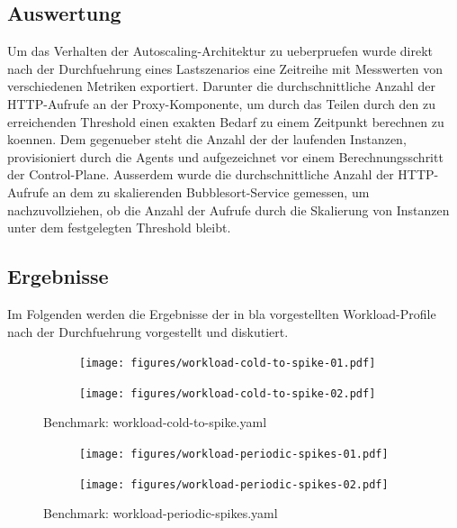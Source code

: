 \documentclass[runningheads]{llncs}
\begin{document}
\subsection{Auswertung}

Um das Verhalten der Autoscaling-Architektur zu ueberpruefen wurde direkt nach der Durchfuehrung eines Lastszenarios eine Zeitreihe mit Messwerten von verschiedenen Metriken exportiert. Darunter die durchschnittliche Anzahl der HTTP-Aufrufe an der Proxy-Komponente, um durch das Teilen durch den zu erreichenden Threshold einen exakten Bedarf zu einem Zeitpunkt berechnen zu koennen. Dem gegenueber steht die Anzahl der der laufenden Instanzen, provisioniert durch die Agents und aufgezeichnet vor einem Berechnungsschritt der Control-Plane. Ausserdem wurde die durchschnittliche Anzahl der HTTP-Aufrufe an dem zu skalierenden Bubblesort-Service gemessen, um nachzuvollziehen, ob die Anzahl der Aufrufe durch die Skalierung von Instanzen unter dem festgelegten Threshold bleibt.

\subsection{Ergebnisse}

Im Folgenden werden die Ergebnisse der in bla vorgestellten Workload-Profile nach der Durchfuehrung vorgestellt und diskutiert.

\begin{figure}
	\centering
	\begin{subfigure}{.5\textwidth}
		\centering
		\texttt{[image: figures/workload-cold-to-spike-01.pdf]}
		\label{fig:sub1}
	\end{subfigure}%
	\begin{subfigure}{.5\textwidth}
		\centering
		\texttt{[image: figures/workload-cold-to-spike-02.pdf]}
		\label{fig:sub2}
	\end{subfigure}
	\caption{Benchmark: workload-cold-to-spike.yaml}
	\label{fig:test}
\end{figure}	

\begin{figure}
	\centering
	\begin{subfigure}{.5\textwidth}
		\centering
		\texttt{[image: figures/workload-periodic-spikes-01.pdf]}
		\label{fig:sub1}
	\end{subfigure}%
	\begin{subfigure}{.5\textwidth}
		\centering
		\texttt{[image: figures/workload-periodic-spikes-02.pdf]}
		\label{fig:sub2}
	\end{subfigure}
	\caption{Benchmark: workload-periodic-spikes.yaml}
	\label{fig:test}
\end{figure}	
\end{document}
